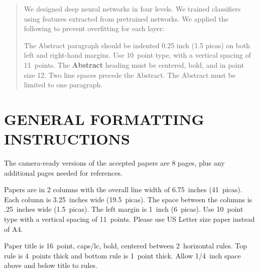 \documentclass[twoside]{article}
\begin{document}
%

%


\begin{abstract}
We designed deep neural networks in four levels. We trained classifiers using features extracted from pretrained networks. We applied the following to prevent overfitting for each layer: 

  The Abstract paragraph should be indented 0.25 inch (1.5 picas) on
  both left and right-hand margins. Use 10~point type, with a vertical
  spacing of 11~points. The \textbf{Abstract} heading must be centered,
  bold, and in point size 12. Two line spaces precede the
  Abstract. The Abstract must be limited to one paragraph.
\end{abstract}

\section{GENERAL FORMATTING INSTRUCTIONS}

The camera-ready versions of the accepted papers are 8 pages,
plus any additional pages needed for references.

Papers are in 2 columns with the overall line width of 6.75~inches (41~picas).
Each column is 3.25~inches wide (19.5~picas).  The space
between the columns is .25~inches wide (1.5~picas).  The left margin is 1~inch (6~picas).
Use 10~point type with a vertical spacing of
11~points. Please use US Letter size paper instead of A4.

Paper title is 16~point, caps/lc, bold, centered between 2~horizontal rules.
Top rule is 4~points thick and bottom rule is 1~point thick.
Allow 1/4~inch space above and below title to rules.
\end{document}
